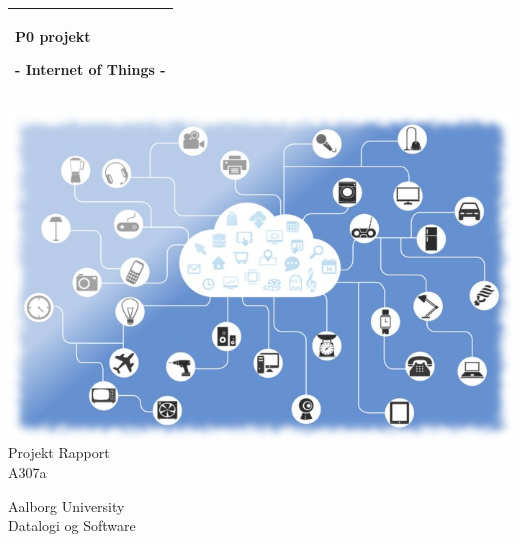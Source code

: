 %
%
%
%
%
\begin{titlepage}
  \addtolength{\hoffset}{0.5\evensidemargin-0.5\oddsidemargin} %
  \noindent%
  \begin{tabular}{@{}p{\textwidth}@{}}
    \toprule[2pt]
    \midrule
    \vspace{0.2cm}
    \begin{center}
    \Huge{\textbf{
      P0 projekt%
    }}
    \end{center}
    \begin{center}
      \Large{
        - Internet of Things -%
      }
    \end{center}
    \vspace{0.2cm}\\
    \midrule
    \toprule[2pt]
  \end{tabular}
  \vspace{2 cm}
  \begin{center}
  \includegraphics[width=\textwidth]{figures/forside2.png}
    {\large
      Projekt Rapport%
    }\\
    \vspace{0.2cm}
    {\Large
      A307a%
    }
  \end{center}
  \vfill
  \begin{center}
  Aalborg University\\
  Datalogi og Software
  \end{center}
\end{titlepage}
\clearpage
